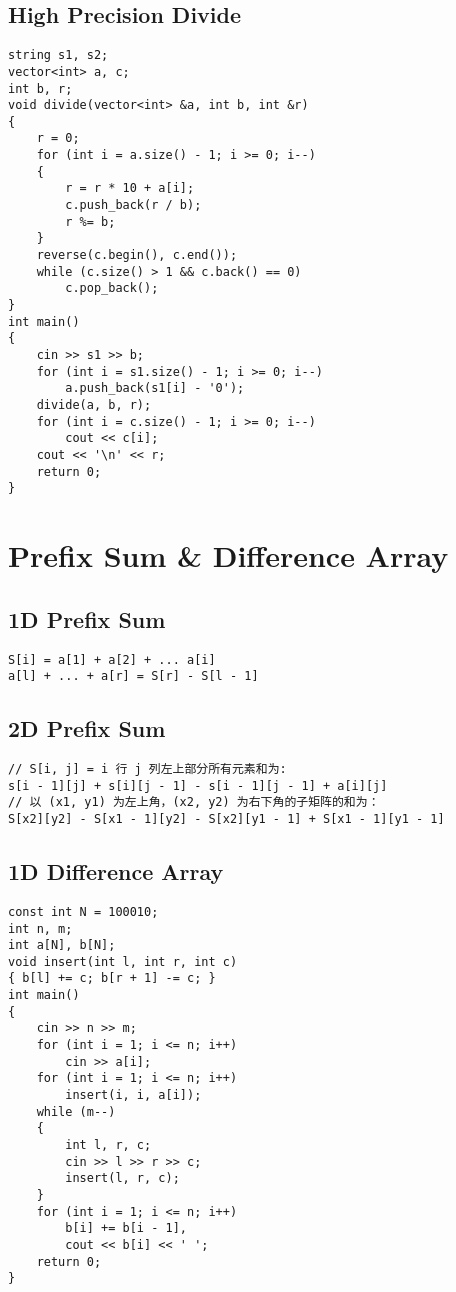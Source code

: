 \subsection{High Precision Divide}
\begin{lstlisting}
string s1, s2;
vector<int> a, c;
int b, r;
void divide(vector<int> &a, int b, int &r)
{
    r = 0;
    for (int i = a.size() - 1; i >= 0; i--)
    {
        r = r * 10 + a[i];
        c.push_back(r / b);
        r %= b;
    }
    reverse(c.begin(), c.end());
    while (c.size() > 1 && c.back() == 0)
        c.pop_back();
}
int main()
{
    cin >> s1 >> b;
    for (int i = s1.size() - 1; i >= 0; i--)
        a.push_back(s1[i] - '0');
    divide(a, b, r);
    for (int i = c.size() - 1; i >= 0; i--)
        cout << c[i];
    cout << '\n' << r;
    return 0;
}
\end{lstlisting}
\section{Prefix Sum \& Difference Array}
\subsection{1D Prefix Sum}
\begin{lstlisting}
S[i] = a[1] + a[2] + ... a[i]
a[l] + ... + a[r] = S[r] - S[l - 1]
\end{lstlisting}
\subsection{2D Prefix Sum}
\begin{lstlisting}
// S[i, j] = i 行 j 列左上部分所有元素和为:
s[i - 1][j] + s[i][j - 1] - s[i - 1][j - 1] + a[i][j]
// 以 (x1, y1) 为左上角，(x2, y2) 为右下角的子矩阵的和为：
S[x2][y2] - S[x1 - 1][y2] - S[x2][y1 - 1] + S[x1 - 1][y1 - 1]
\end{lstlisting}
\subsection{1D Difference Array}
\begin{lstlisting}
const int N = 100010;
int n, m;
int a[N], b[N];
void insert(int l, int r, int c)
{ b[l] += c; b[r + 1] -= c; }
int main()
{
    cin >> n >> m;
    for (int i = 1; i <= n; i++)
        cin >> a[i];
    for (int i = 1; i <= n; i++)
        insert(i, i, a[i]);
    while (m--)
    {
        int l, r, c;
        cin >> l >> r >> c;
        insert(l, r, c);
    }
    for (int i = 1; i <= n; i++)
        b[i] += b[i - 1], 
        cout << b[i] << ' ';
    return 0;
}
\end{lstlisting}
